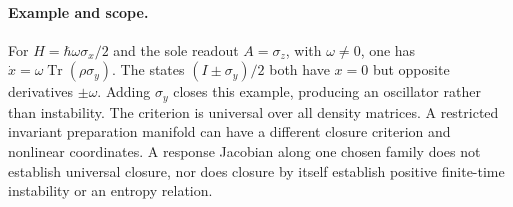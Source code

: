\documentclass[11pt,a4paper]{article}
\newcommand{\Tr}{\operatorname{Tr}}
\begin{document}
\paragraph{Example and scope.}
For $H=\hbar\omega\sigma_x/2$ and the sole readout $A=\sigma_z$, with $\omega\ne0$, one has $\dot x=\omega\Tr(\rho\sigma_y)$. The states $(I\pm\sigma_y)/2$ both have $x=0$ but opposite derivatives $\pm\omega$. Adding $\sigma_y$ closes this example, producing an oscillator rather than instability.
The criterion is universal over all density matrices. A restricted invariant preparation manifold can have a different closure criterion and nonlinear coordinates. A response Jacobian along one chosen family does not establish universal closure, nor does closure by itself establish positive finite-time instability or an entropy relation.
\end{document}
